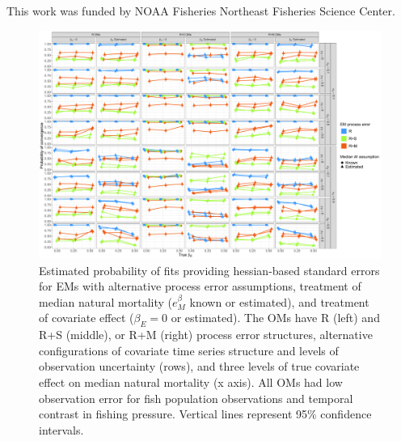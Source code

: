 \documentclass[
  12pt,
]{article}
\newlength{\cslhangindent}
\newlength{\cslentryspacingunit} %
\newenvironment{CSLReferences}[2] %
 {%
  \setlength{\parindent}{0pt}
  \ifodd #1
  \let\oldpar\par
  \def\par{\hangindent=\cslhangindent\oldpar}
  \fi
  \setlength{\parskip}{#2\cslentryspacingunit}
 }%
 {}
\begin{document}
This work was funded by NOAA Fisheries Northeast Fisheries Science Center.

\pagebreak



\hypertarget{refs}{}
\begin{CSLReferences}{0}{0}
\end{CSLReferences}

\pagebreak

\begin{landscape}
\begin{figure}
\begin{center}
\includegraphics{convergence_main}
\end{center}
\caption{Estimated probability of fits providing hessian-based standard errors for EMs with alternative process error assumptions, treatment of median natural mortality ($e^\beta_M$ known or estimated), and treatment of covariate effect ($\beta_E = 0$ or estimated). The OMs have R (left) and R+S (middle), or R+M (right) process error structures, alternative configurations of covariate time series structure and levels of observation uncertainty (rows), and three levels of true covariate effect on median natural mortality (x axis). All OMs had low observation error for fish population observations and temporal contrast in fishing pressure. Vertical lines represent 95\% confidence intervals.}\label{convergence}
\end{figure}
\end{landscape}
\end{document}
